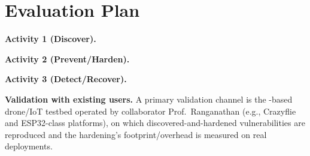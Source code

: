 \section{Evaluation Plan}


\noindent\textbf{Activity 1 (Discover).}

\noindent\textbf{Activity 2 (Prevent/Harden).}

\noindent\textbf{Activity 3 (Detect/Recover).}

\noindent\textbf{Validation with existing users.}
A primary validation channel is the \ose-based drone/IoT testbed operated by collaborator Prof.\ Ranganathan (e.g., Crazyflie and ESP32-class platforms), on which discovered-and-hardened vulnerabilities are reproduced and the hardening's footprint/overhead is measured on real deployments.
